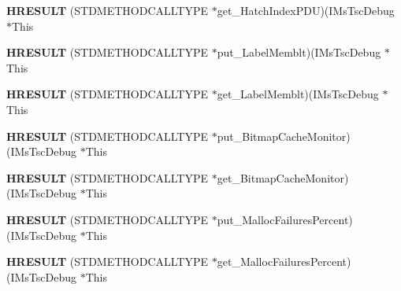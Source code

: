 \begin{DoxyCompactItemize}
\item 
\mbox{\label{struct_i_ms_tsc_debug_vtbl_a616f99402e13b92662bb238cd77099cb}} 
{\bfseries H\+R\+E\+S\+U\+LT} (S\+T\+D\+M\+E\+T\+H\+O\+D\+C\+A\+L\+L\+T\+Y\+PE $\ast$get\+\_\+\+Hatch\+Index\+P\+DU)(I\+Ms\+Tsc\+Debug $\ast$This
\item 
\mbox{\label{struct_i_ms_tsc_debug_vtbl_a238c97663f8f765bdccd3a70fd1dffef}} 
{\bfseries H\+R\+E\+S\+U\+LT} (S\+T\+D\+M\+E\+T\+H\+O\+D\+C\+A\+L\+L\+T\+Y\+PE $\ast$put\+\_\+\+Label\+Memblt)(I\+Ms\+Tsc\+Debug $\ast$This
\item 
\mbox{\label{struct_i_ms_tsc_debug_vtbl_a3393a13d7a383c5bce51abc67cae66a9}} 
{\bfseries H\+R\+E\+S\+U\+LT} (S\+T\+D\+M\+E\+T\+H\+O\+D\+C\+A\+L\+L\+T\+Y\+PE $\ast$get\+\_\+\+Label\+Memblt)(I\+Ms\+Tsc\+Debug $\ast$This
\item 
\mbox{\label{struct_i_ms_tsc_debug_vtbl_a1780152519436e2398d70c985d8bd4d4}} 
{\bfseries H\+R\+E\+S\+U\+LT} (S\+T\+D\+M\+E\+T\+H\+O\+D\+C\+A\+L\+L\+T\+Y\+PE $\ast$put\+\_\+\+Bitmap\+Cache\+Monitor)(I\+Ms\+Tsc\+Debug $\ast$This
\item 
\mbox{\label{struct_i_ms_tsc_debug_vtbl_a723ed122b9570bdc695a3d71c12611b9}} 
{\bfseries H\+R\+E\+S\+U\+LT} (S\+T\+D\+M\+E\+T\+H\+O\+D\+C\+A\+L\+L\+T\+Y\+PE $\ast$get\+\_\+\+Bitmap\+Cache\+Monitor)(I\+Ms\+Tsc\+Debug $\ast$This
\item 
\mbox{\label{struct_i_ms_tsc_debug_vtbl_a247854cf9e3be9eb20157c712e710a81}} 
{\bfseries H\+R\+E\+S\+U\+LT} (S\+T\+D\+M\+E\+T\+H\+O\+D\+C\+A\+L\+L\+T\+Y\+PE $\ast$put\+\_\+\+Malloc\+Failures\+Percent)(I\+Ms\+Tsc\+Debug $\ast$This
\item 
\mbox{\label{struct_i_ms_tsc_debug_vtbl_ad0fdbd9df3c02da9f56a82aa52e3c52d}} 
{\bfseries H\+R\+E\+S\+U\+LT} (S\+T\+D\+M\+E\+T\+H\+O\+D\+C\+A\+L\+L\+T\+Y\+PE $\ast$get\+\_\+\+Malloc\+Failures\+Percent)(I\+Ms\+Tsc\+Debug $\ast$This
\item 
\mbox{\label{struct_i_ms_tsc_debug_vtbl_ac30610a5c3dde8a8e31e36161e664033}} 

\end{DoxyCompactItemize}
